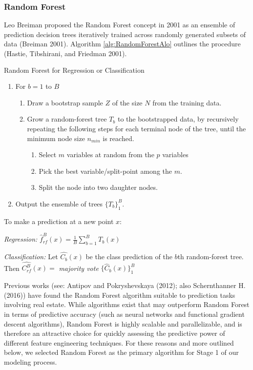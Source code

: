 \documentclass[12pt,]{article}
\begin{document}
\hypertarget{random-forest}{%
\subsubsection{Random Forest}\label{random-forest}}

Leo Breiman proposed the Random Forest concept in 2001 as an ensemble of
prediction decision trees iteratively trained across randomly generated
subsets of data (Breiman 2001). Algorithm \ref{alg:RandomForestAlo}
outlines the procedure (Hastie, Tibshirani, and Friedman 2001).

\begin{algorithm}
  \caption{Random Forest for Regression or Classification}\label{alg:RandomForestAlo}

\begin{enumerate}
  \item For $b = 1$ to $B$
  \begin{enumerate}
    \item Draw a bootstrap sample $Z$ of the size $N$ from the training data.
    \item Grow a random-forest tree $T_b$ to the bootstrapped data, by recursively repeating the following steps for each terminal node of the tree, until the minimum node size $n_{min}$ is reached.
  \begin{enumerate}
    \item Select $m$ variables at random from the $p$ variables
    \item Pick the best variable/split-point among the $m$.
    \item Split the node into two daughter nodes.
  \end{enumerate}
  \end{enumerate}
  \item Output the ensemble of trees $\{T_b\}_1^B$.
\end{enumerate}

To make a prediction at a new point $x$:

\textit{Regression:} $\hat{f}_{rf}^B(x) = \frac{1}{B}\sum_{b=1}^{B}T_b(x)$

\textit{Classification:} Let $\hat{C_b}(x)$ be the class prediction of the $b$th random-forest tree. Then $\hat{C_{rf}^B}(x)=$ \textit{majority vote} $\{\hat{C}_{b}(x)\}_1^B $

\end{algorithm}

Previous works (see: Antipov and Pokryshevskaya (2012); also
Schernthanner H. (2016)) have found the Random Forest algorithm suitable
to prediction tasks involving real estate. While algorithms exist that
may outperform Random Forest in terms of predictive accuracy (such as
neural networks and functional gradient descent algorithms), Random
Forest is highly scalable and parallelizable, and is therefore an
attractive choice for quickly assessing the predictive power of
different feature engineering techniques. For these reasons and more
outlined below, we selected Random Forest as the primary algorithm for
Stage 1 of our modeling process.
\end{document}

